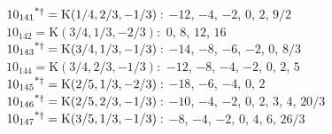 $10_{141}\textsuperscript{*$\dagger$} = \mathrm{K}(1/4, 2/3, -1/3):$  $-12$, $-4$, $-2$, $0$, $2$, $9/2$\\ 
$10_{142} = \mathrm{K}(3/4, 1/3, -2/3):$  $0$, $8$, $12$, $16$\\ 
$10_{143}\textsuperscript{*$\dagger$} = \mathrm{K}(3/4, 1/3, -1/3):$  $-14$, $-8$, $-6$, $-2$, $0$, $8/3$\\ 
$10_{144} = \mathrm{K}(3/4, 2/3, -1/3):$  $-12$, $-8$, $-4$, $-2$, $0$, $2$, $5$\\ 
$10_{145}\textsuperscript{*$\dagger$} = \mathrm{K}(2/5, 1/3, -2/3):$  $-18$, $-6$, $-4$, $0$, $2$\\ 
$10_{146}\textsuperscript{*$\dagger$} = \mathrm{K}(2/5, 2/3, -1/3):$  $-10$, $-4$, $-2$, $0$, $2$, $3$, $4$, $20/3$\\ 
$10_{147}\textsuperscript{*$\dagger$} = \mathrm{K}(3/5, 1/3, -1/3):$  $-8$, $-4$, $-2$, $0$, $4$, $6$, $26/3$\\ 
